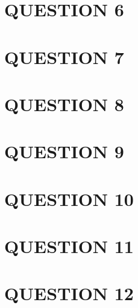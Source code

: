 \documentclass[a4paper]{article}
\begin{document}
\section{QUESTION 6}
\section{QUESTION 7}
\section{QUESTION 8}
\section{QUESTION 9}
\section{QUESTION 10}
\section{QUESTION 11}
\section{QUESTION 12}
\end{document}
